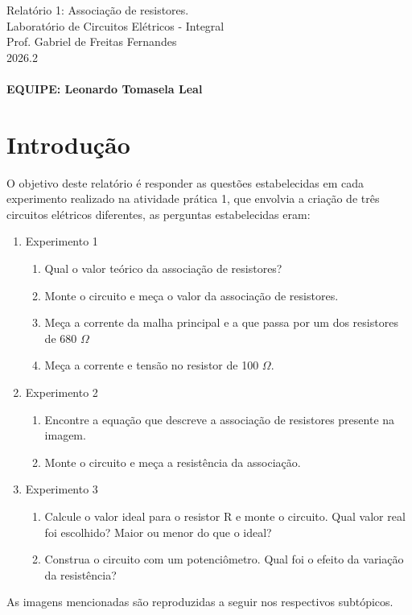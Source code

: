 \documentclass[a4paper,oneside,10pt]{article}
\begin{document}
\noindent Relatório 1: Associação de resistores. \\
Laboratório de Circuitos Elétricos - Integral\\
Prof. Gabriel de Freitas Fernandes\\
2026.2\\
\\
\textbf{EQUIPE: Leonardo Tomasela Leal}
\\

\section{Introdução}

O objetivo deste relatório é responder as questões estabelecidas em cada experimento realizado na atividade prática 1, que envolvia a criação de três circuitos elétricos diferentes, as perguntas estabelecidas eram:
\begin{enumerate}
	\item Experimento 1
	\begin{enumerate}
		\item Qual o valor teórico da associação de resistores?
		\item Monte o circuito e meça o valor da associação de resistores.
		\item Meça a corrente da malha principal e a que passa por um dos resistores de 680 $\Omega$
		\item Meça a corrente e tensão no resistor de 100 $\Omega$.
	\end{enumerate}
	\item Experimento 2
	\begin{enumerate}
		\item Encontre a equação que descreve a associação de resistores presente na imagem.
		\item Monte o circuito e meça a resistência da associação.
	\end{enumerate}
	\item Experimento 3
	\begin{enumerate}
		\item Calcule o valor ideal para o resistor R e monte o circuito. Qual valor real foi escolhido? Maior ou menor do que o ideal?
		\item Construa o circuito com um potenciômetro. Qual foi o efeito da variação da resistência?
	\end{enumerate}
\end{enumerate}

As imagens mencionadas são reproduzidas a seguir nos respectivos subtópicos.
\end{document}
